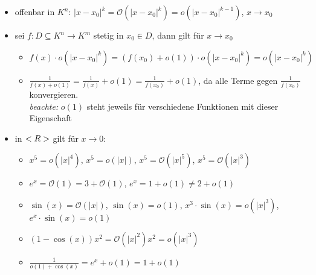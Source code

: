 \begin{example}
	\begin{itemize}
		\item offenbar in $K^n$: $\vert x-x_0\vert^k=\mathcal{O}(\vert x-x_0\vert^k)=o(\vert x-x_0\vert^{k-1})$, $x\to x_0$
		\item sei $f:D\subseteq K^n\to K^m$ stetig in $x_0\in D$, dann gilt für $x\to x_0$
		\begin{itemize}
			\item $f(x)\cdot o(\vert x-x_0\vert^k)=(f(x_0)+o(1))\cdot o(\vert x-x_0\vert^k)=o(\vert x-x_0\vert^k)$
			\item $\frac{1}{f(x)+o(1)}=\frac{1}{f(x)}+o(1)=\frac{1}{f(x_0)}+o(1)$, da alle Terme gegen $\frac{1}{f(x_0)}$ konvergieren. \\
			\emph{beachte:} $o(1)$ steht jeweils für verschiedene Funktionen mit dieser Eigenschaft
		\end{itemize}
		\item in $<R>$ gilt für $x\to 0$:
		\begin{itemize}
			\item $x^5=o(\vert x\vert^4)$, $x^5=o(\vert x\vert)$, $x^5=\mathcal{O}(\vert x\vert^5)$, $x^5=\mathcal{O}(\vert x\vert^3)$
			\item $e^x=\mathcal{O}(1)=3+\mathcal{O}(1)$, $e^x=1+o(1)\neq 2+o(1)$
			\item $\sin(x)=\mathcal{O}(\vert x\vert)$, $\sin(x)=o(1)$, $x^3\cdot\sin(x)=o(\vert x\vert^3)$, $e^x\cdot \sin(x)=o(1)$
			\item $(1-\cos(x))x^2=\mathcal{O}(\vert x\vert^2)x^2=o(\vert x\vert^3)$
			\item $\frac{1}{o(1)+\cos(x)}=e^x+o(1)=1+o(1)$
		\end{itemize}
	\end{itemize}
\end{example}